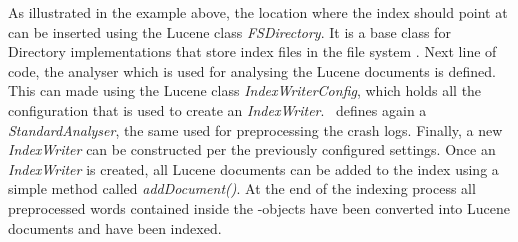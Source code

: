 As illustrated in the example above, the location where the index should point at can be inserted using the Lucene class \textit{FSDirectory}. It is a base class for Directory implementations that store index files in the file system \cite{lucenefsdir}. Next line of code, the analyser which is used for analysing the Lucene documents is defined. This can made using the Lucene class \textit{IndexWriterConfig}, which holds all the configuration that is used to create an \textit{IndexWriter}. \toolname\ defines again a \textit{StandardAnalyser}, the same used for preprocessing the crash logs.
Finally, a new \textit{IndexWriter} can be constructed per the previously configured settings. 
Once an \textit{IndexWriter} is created, all Lucene documents can be added to the index using a simple method called \textit{addDocument()}. At the end of the indexing process all preprocessed words contained inside the \Crash-objects have been converted into Lucene documents and have been indexed.


